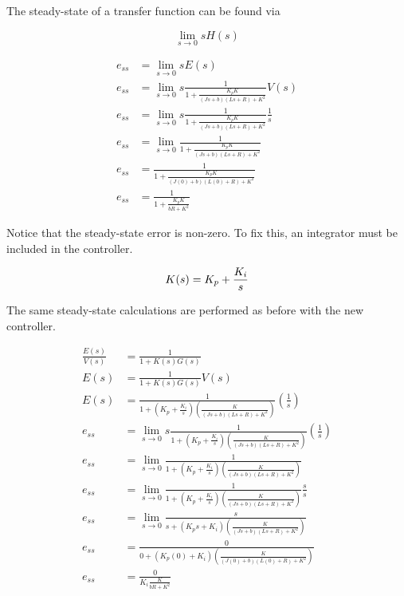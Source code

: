 \documentclass[10pt,conference,compsoc]{IEEEtran}
\begin{document}
The steady-state of a transfer function can be found via

\begin{equation}
  \lim_{s\to0} sH(s)
\end{equation}

\begin{align}
  e_{ss} &= \lim_{s\to0} sE(s) \nonumber \\
  e_{ss} &= \lim_{s\to0} s \frac{1}{1 + \frac{K_p K}{(Js+b)(Ls+R)+K^2}} V(s)
    \nonumber \\
  e_{ss} &= \lim_{s\to0} s \frac{1}{1 + \frac{K_p K}{(Js+b)(Ls+R)+K^2}}
    \frac{1}{s} \nonumber \\
  e_{ss} &= \lim_{s\to0} \frac{1}{1 + \frac{K_p K}{(Js+b)(Ls+R)+K^2}}
    \nonumber \\
  e_{ss} &= \frac{1}{1 + \frac{K_p K}{(J(0)+b)(L(0)+R)+K^2}} \nonumber \\
  e_{ss} &= \frac{1}{1 + \frac{K_p K}{bR+K^2}} \label{eq:ss_nonzero}
\end{align}

\noindent Notice that the \gls{steady-state error} is non-zero. To fix this, an
integrator must be included in the controller.

\begin{equation*}
  K(s) = K_p + \frac{K_i}{s} \\
\end{equation*}

\noindent The same steady-state calculations are performed as before with the
new controller.

\begin{align*}
  \frac{E(s)}{V(s)} &= \frac{1}{1 + K(s)G(s)} \\
  E(s) &= \frac{1}{1 + K(s)G(s)} V(s) \\
  E(s) &= \frac{1}{1 + \left(K_p + \frac{K_i}{s}\right)
    \left(\frac{K}{(Js+b)(Ls+R)+K^2}\right)} \left(\frac{1}{s}\right) \\
  e_{ss} &= \lim_{s\to0} s \frac{1}{1 + \left(K_p + \frac{K_i}{s}\right)
    \left(\frac{K}{(Js+b)(Ls+R)+K^2}\right)} \left(\frac{1}{s}\right) \\
  e_{ss} &= \lim_{s\to0} \frac{1}{1 + \left(K_p + \frac{K_i}{s}\right)
    \left(\frac{K}{(Js+b)(Ls+R)+K^2}\right)} \\
  e_{ss} &= \lim_{s\to0} \frac{1}{1 + \left(K_p + \frac{K_i}{s}\right)
    \left(\frac{K}{(Js+b)(Ls+R)+K^2}\right)} \frac{s}{s} \\
  e_{ss} &= \lim_{s\to0} \frac{s}{s + \left(K_p s + K_i\right)
    \left(\frac{K}{(Js+b)(Ls+R)+K^2}\right)} \\
  e_{ss} &= \frac{0}{0 + (K_p (0) + K_i)
    \left(\frac{K}{(J(0)+b)(L(0)+R)+K^2}\right)} \\
  e_{ss} &= \frac{0}{K_i \frac{K}{bR+K^2}} \\
\end{align*}
\end{document}
